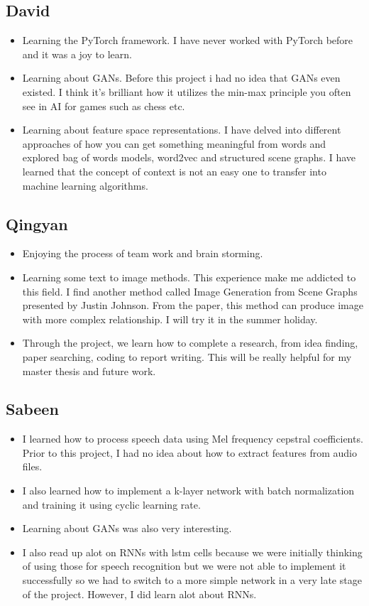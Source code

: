 \documentclass[../main.tex]{subfiles}
\begin{document}
\subsection{David}
\begin{itemize}
    \item Learning the PyTorch framework. I have never worked with PyTorch before and it was a joy to learn. 
    \item Learning about GANs. Before this project i had no idea that GANs even existed. I think it's brilliant how it utilizes the min-max principle you often see in AI for games such as chess etc.
    \item Learning about feature space representations. I have delved into different approaches of how you can get something meaningful from words and explored bag of words models, word2vec and structured scene graphs. I have learned that the concept of context is not an easy one to transfer into machine learning algorithms.
\end{itemize}
\subsection{Qingyan}
\begin{itemize}
    \item Enjoying the process of team work and brain storming.
    \item Learning some text to image methods. This experience make me addicted to this field. I find another method called Image Generation from Scene Graphs presented by Justin Johnson. From the paper, this method can produce image with more complex relationship. I will try it in the summer holiday.
    \item Through the project, we learn how to complete a research, from idea finding, paper searching, coding to report writing. This will be really helpful for my master thesis and future work. 
\end{itemize}
\subsection{Sabeen}
\begin{itemize}
    \item I learned how to process speech data using Mel frequency cepstral coefficients. Prior to this project, I had no idea about how to extract features from audio files. 
    \item I also learned how to implement a k-layer network with batch normalization and training it using cyclic learning rate. 
    \item Learning about GANs was also very interesting.
    \item I also read up alot on RNNs with lstm cells because we were initially thinking of using those for speech recognition but we were not able to implement it successfully so we had to switch to a more simple network in a very late stage of the project. However, I did learn alot about RNNs. 
\end{itemize}
\end{document}
